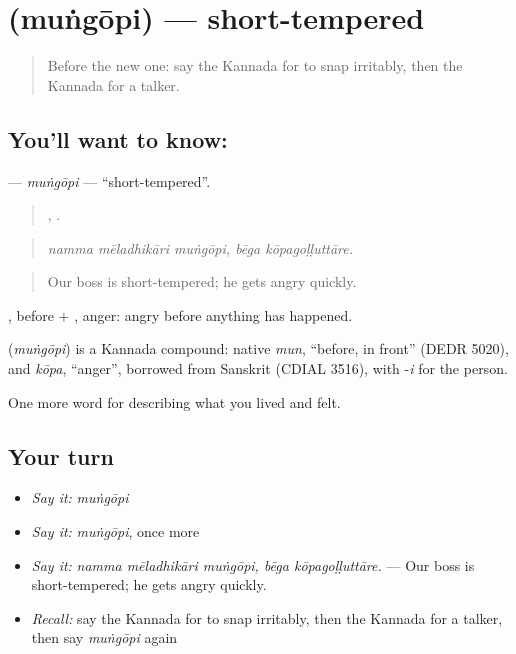 \section[\texorpdfstring{\kn{ಮುಂಗೋಪಿ} (muṅgōpi)}{ಮುಂಗೋಪಿ (muṅgōpi)}]{ (muṅgōpi) — short-tempered}

\label{lesson:KA-C504-mungopi}



\begin{quote}
Before the new one: say the Kannada for to snap irritably, then the Kannada for a talker.
\end{quote}

\subsection*{You'll want to know: }
\textbf{} — \emph{muṅgōpi} — \textquotedblleft{}short-tempered\textquotedblright{}.

\begin{quote}
  ,  .
\end{quote}

\begin{quote}
\emph{namma mēladhikāri muṅgōpi, bēga kōpagoḷḷuttāre.}
\end{quote}

\begin{quote}
Our boss is short-tempered; he gets angry quickly.
\end{quote}

, before + , anger: angry before anything has happened.

\begin{cousinweb}
\textbf{} (\emph{muṅgōpi}) is a Kannada compound: native \emph{mun}, \textquotedblleft{}before, in front\textquotedblright{} (DEDR 5020), and \emph{kōpa}, \textquotedblleft{}anger\textquotedblright{}, borrowed from Sanskrit (CDIAL 3516), with -\emph{i} for the person.
\end{cousinweb}

\begin{grammarlens}[title={What you've built}]
One more word for describing what you lived and felt.
\end{grammarlens}

\subsection*{Your turn}
\begin{itemize}
\raggedright
  \item \emph{Say it:} \emph{muṅgōpi}
  \item \emph{Say it:} \emph{muṅgōpi}, once more
  \item \emph{Say it:} \emph{namma mēladhikāri muṅgōpi, bēga kōpagoḷḷuttāre.} — Our boss is short-tempered; he gets angry quickly.
  \item \emph{Recall:} say the Kannada for to snap irritably, then the Kannada for a talker, then say \emph{muṅgōpi} again
\end{itemize}

